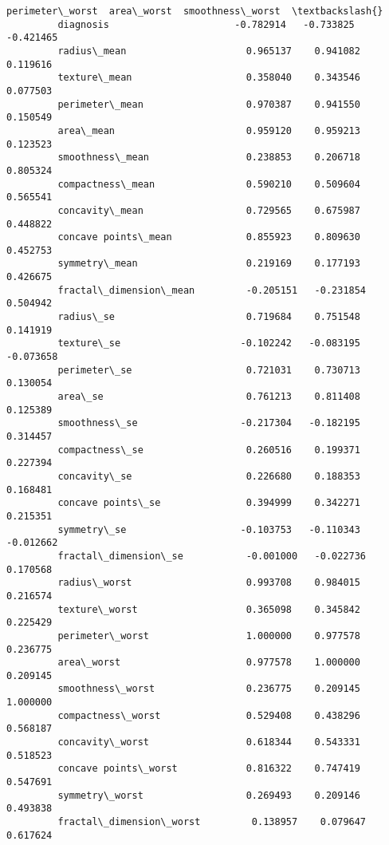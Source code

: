 \documentclass[11pt]{article}
\begin{document}
\begin{Verbatim}[commandchars=\\\{\}]
                                  perimeter\_worst  area\_worst  smoothness\_worst  \textbackslash{}
         diagnosis                      -0.782914   -0.733825         -0.421465   
         radius\_mean                     0.965137    0.941082          0.119616   
         texture\_mean                    0.358040    0.343546          0.077503   
         perimeter\_mean                  0.970387    0.941550          0.150549   
         area\_mean                       0.959120    0.959213          0.123523   
         smoothness\_mean                 0.238853    0.206718          0.805324   
         compactness\_mean                0.590210    0.509604          0.565541   
         concavity\_mean                  0.729565    0.675987          0.448822   
         concave points\_mean             0.855923    0.809630          0.452753   
         symmetry\_mean                   0.219169    0.177193          0.426675   
         fractal\_dimension\_mean         -0.205151   -0.231854          0.504942   
         radius\_se                       0.719684    0.751548          0.141919   
         texture\_se                     -0.102242   -0.083195         -0.073658   
         perimeter\_se                    0.721031    0.730713          0.130054   
         area\_se                         0.761213    0.811408          0.125389   
         smoothness\_se                  -0.217304   -0.182195          0.314457   
         compactness\_se                  0.260516    0.199371          0.227394   
         concavity\_se                    0.226680    0.188353          0.168481   
         concave points\_se               0.394999    0.342271          0.215351   
         symmetry\_se                    -0.103753   -0.110343         -0.012662   
         fractal\_dimension\_se           -0.001000   -0.022736          0.170568   
         radius\_worst                    0.993708    0.984015          0.216574   
         texture\_worst                   0.365098    0.345842          0.225429   
         perimeter\_worst                 1.000000    0.977578          0.236775   
         area\_worst                      0.977578    1.000000          0.209145   
         smoothness\_worst                0.236775    0.209145          1.000000   
         compactness\_worst               0.529408    0.438296          0.568187   
         concavity\_worst                 0.618344    0.543331          0.518523   
         concave points\_worst            0.816322    0.747419          0.547691   
         symmetry\_worst                  0.269493    0.209146          0.493838   
         fractal\_dimension\_worst         0.138957    0.079647          0.617624   
         

\end{Verbatim}
\end{document}

